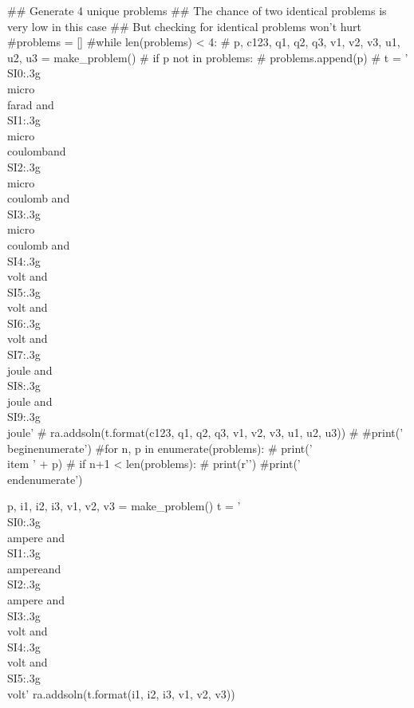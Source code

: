 \documentclass[12pt]{exam}
\begin{document}
\begin{questions}
\begin{pycode}
## Generate 4 unique problems
## The chance of two identical problems is very low in this case
## But checking for identical problems won't hurt
#problems = []
#while len(problems) < 4:
#    p, c123, q1, q2, q3, v1, v2, v3, u1, u2, u3 = make_problem()
#    if p not in problems:
#        problems.append(p)
#        t = '\\SI{{{0:.3g}}}{{\\micro\\farad}} and \\SI{{{1:.3g}}}{{\\micro\\coulomb}}and \\SI{{{2:.3g}}}{{\\micro\\coulomb}} and \\SI{{{3:.3g}}}{{\\micro\\coulomb}} and \\SI{{{4:.3g}}}{{\\volt}} and \\SI{{{5:.3g}}}{{\\volt}} and \\SI{{{6:.3g}}}{{\\volt}} and \\SI{{{7:.3g}}}{{\\joule}} and \\SI{{{8:.3g}}}{{\\joule}} and \\SI{{{9:.3g}}}{{\\joule}}'
#        ra.addsoln(t.format(c123, q1, q2, q3, v1, v2, v3, u1, u2, u3))
#
#print('\\begin{enumerate}')
#for n, p in enumerate(problems):
#    print('\\item ' + p)
#    if n+1 < len(problems):
#        print(r'\vspace{1in}')
#print('\\end{enumerate}')

p, i1, i2, i3, v1, v2, v3 = make_problem()
t = '\\SI{{{0:.3g}}}{{\\ampere}} and \\SI{{{1:.3g}}}{{\\ampere}}and \\SI{{{2:.3g}}}{{\\ampere}} and \\SI{{{3:.3g}}}{{\\volt}} and \\SI{{{4:.3g}}}{{\\volt}} and \\SI{{{5:.3g}}}{{\\volt}}'
ra.addsoln(t.format(i1, i2, i3, v1, v2, v3))


\end{pycode}
\end{questions}
\end{document}
